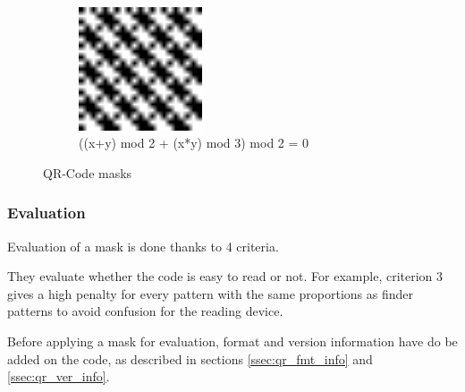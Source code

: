\begin{figure}[H]
\begin{subfigure}{0.4\textwidth}
    \centering
    \includegraphics[width=0.4\textwidth]{images/qr_mask_7}
    \caption{((x+y) mod 2 + (x*y) mod 3) mod 2 = 0}
    \label{fig:qr_mask_7}
  \end{subfigure}
  \caption{QR-Code masks}
  \label{fig:qr_masks}
\end{figure}


\subsubsection{Evaluation}
\label{sssec:qr_mask_eval}

Evaluation of a mask is done thanks to 4 criteria.

They evaluate whether the code is easy to read or not. For example, criterion 3 gives a high penalty for every pattern with the same proportions as finder patterns to avoid confusion for the reading device.

Before applying a mask for evaluation, format and version information have do be added on the code, as described in sections \ref{ssec:qr_fmt_info} and \ref{ssec:qr_ver_info}.


